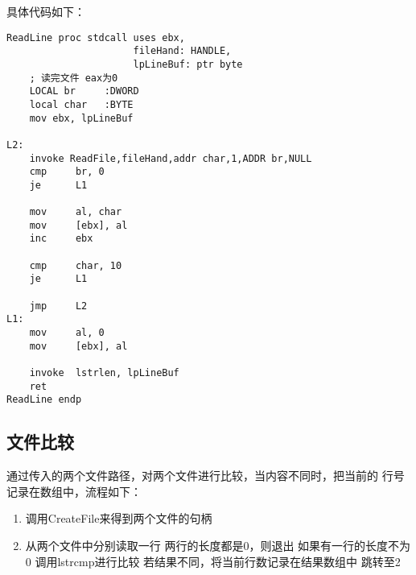 具体代码如下：
\begin{lstlisting}
ReadLine proc stdcall uses ebx, 
                      fileHand: HANDLE, 
                      lpLineBuf: ptr byte
    ; 读完文件 eax为0
    LOCAL br     :DWORD
    local char   :BYTE
    mov ebx, lpLineBuf

L2:
    invoke ReadFile,fileHand,addr char,1,ADDR br,NULL
    cmp     br, 0
    je      L1

    mov     al, char  
    mov     [ebx], al
    inc     ebx
    
    cmp     char, 10
    je      L1
    
    jmp     L2
L1:
    mov     al, 0
    mov     [ebx], al

    invoke  lstrlen, lpLineBuf
    ret     
ReadLine endp

\end{lstlisting}

\subsection{文件比较}

通过传入的两个文件路径，对两个文件进行比较，当内容不同时，把当前的
行号记录在数组中，流程如下：

\begin{enumerate}
    \item 调用CreateFile来得到两个文件的句柄
    \item 从两个文件中分别读取一行
        \iitem 两行的长度都是0，则退出
        \iitem 如果有一行的长度不为0
            \iiitem 调用lstrcmp进行比较
            \iiitem 若结果不同，将当前行数记录在结果数组中
            \iiitem 跳转至2
\end{enumerate}

